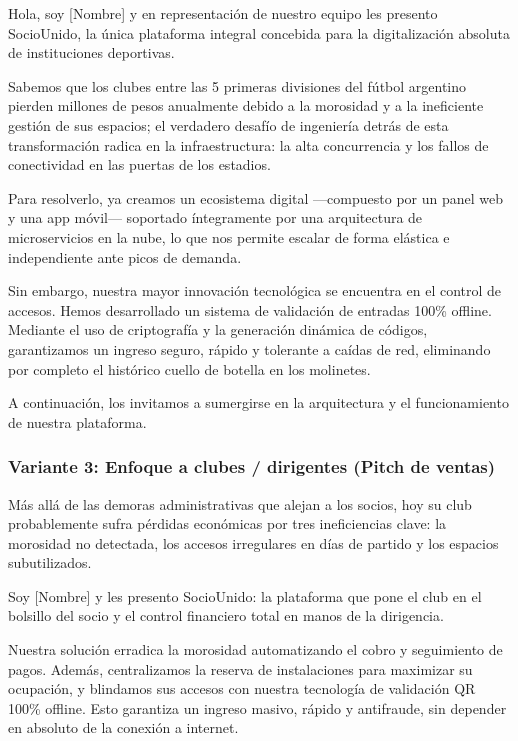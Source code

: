 Hola, soy [Nombre] y en representación de nuestro equipo les presento SocioUnido, la única plataforma integral concebida para la digitalización absoluta de instituciones deportivas.

Sabemos que los clubes entre las 5 primeras divisiones del fútbol argentino pierden millones de pesos anualmente debido a la morosidad y a la ineficiente gestión de sus espacios; el verdadero desafío de ingeniería detrás de esta transformación radica en la infraestructura: la alta concurrencia y los fallos de conectividad en las puertas de los estadios.

Para resolverlo, ya creamos un ecosistema digital —compuesto por un panel web y una app móvil— soportado íntegramente por una arquitectura de microservicios en la nube, lo que nos permite escalar de forma elástica e independiente ante picos de demanda.

Sin embargo, nuestra mayor innovación tecnológica se encuentra en el control de accesos. Hemos desarrollado un sistema de validación de entradas 100\% offline. Mediante el uso de criptografía y la generación dinámica de códigos, garantizamos un ingreso seguro, rápido y tolerante a caídas de red, eliminando por completo el histórico cuello de botella en los molinetes.

A continuación, los invitamos a sumergirse en la arquitectura y el funcionamiento de nuestra plataforma.

\subsubsection{Variante 3: Enfoque a clubes / dirigentes (Pitch de ventas)}

Más allá de las demoras administrativas que alejan a los socios, hoy su club probablemente sufra pérdidas económicas por tres ineficiencias clave: la morosidad no detectada, los accesos irregulares en días de partido y los espacios subutilizados.

Soy [Nombre] y les presento SocioUnido: la plataforma que pone el club en el bolsillo del socio y el control financiero total en manos de la dirigencia.

Nuestra solución erradica la morosidad automatizando el cobro y seguimiento de pagos. Además, centralizamos la reserva de instalaciones para maximizar su ocupación, y blindamos sus accesos con nuestra tecnología de validación QR 100\% offline. Esto garantiza un ingreso masivo, rápido y antifraude, sin depender en absoluto de la conexión a internet.

